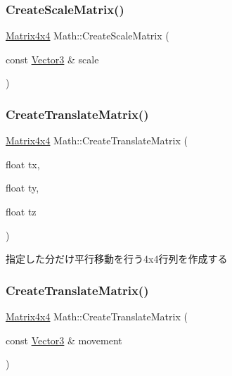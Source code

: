 \mbox{\label{namespace_math_abb993929e559b690bbb60e9504f3ad95}} 
\subsubsection{\texorpdfstring{Create\+Scale\+Matrix()}{CreateScaleMatrix()}\hspace{0.1cm}{\footnotesize\ttfamily [3/3]}}
{\footnotesize\ttfamily \mbox{\hyperlink{struct_math_1_1_matrix4x4}{Matrix4x4}} Math\+::\+Create\+Scale\+Matrix (\begin{DoxyParamCaption}\item[{const \mbox{\hyperlink{struct_math_1_1_vector3}{Vector3}} \&}]{scale }\end{DoxyParamCaption})}

\mbox{\label{namespace_math_a22c654a35f22329b5f0ed96a82d843ca}} 
\subsubsection{\texorpdfstring{Create\+Translate\+Matrix()}{CreateTranslateMatrix()}\hspace{0.1cm}{\footnotesize\ttfamily [1/2]}}
{\footnotesize\ttfamily \mbox{\hyperlink{struct_math_1_1_matrix4x4}{Matrix4x4}} Math\+::\+Create\+Translate\+Matrix (\begin{DoxyParamCaption}\item[{float}]{tx,  }\item[{float}]{ty,  }\item[{float}]{tz }\end{DoxyParamCaption})}



指定した分だけ平行移動を行う4x4行列を作成する 

\mbox{\label{namespace_math_ad0007f1238972eb1db1fa2f1a2d3b834}} 
\subsubsection{\texorpdfstring{Create\+Translate\+Matrix()}{CreateTranslateMatrix()}\hspace{0.1cm}{\footnotesize\ttfamily [2/2]}}
{\footnotesize\ttfamily \mbox{\hyperlink{struct_math_1_1_matrix4x4}{Matrix4x4}} Math\+::\+Create\+Translate\+Matrix (\begin{DoxyParamCaption}\item[{const \mbox{\hyperlink{struct_math_1_1_vector3}{Vector3}} \&}]{movement }\end{DoxyParamCaption})}

